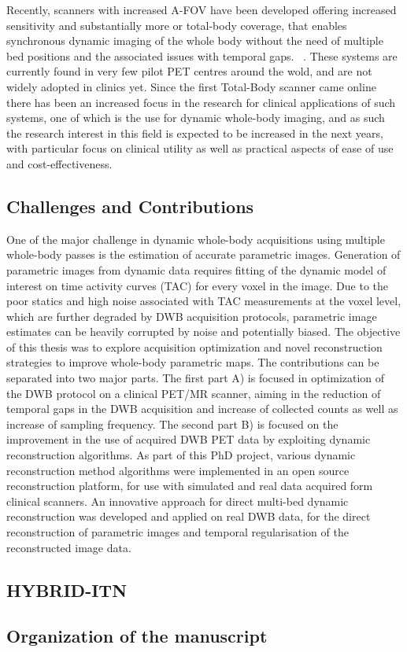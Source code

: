 Recently, scanners with increased A-FOV have been developed offering increased sensitivity and substantially more or total-body coverage, that enables synchronous dynamic imaging of the whole body without the need of multiple bed positions and the associated issues with temporal gaps. ~\cite{Karp2020,Siegel2020, Cherry2018}.
These systems are currently found in very few pilot PET centres around the wold, and are not widely adopted in clinics yet. Since the first Total-Body scanner came online there has been an increased focus in the research for clinical applications of such systems, one of which is the use for dynamic whole-body imaging, and as such the research interest in this field is expected to be increased in the next years, with particular focus on clinical utility as well as practical aspects of ease of use and cost-effectiveness.
\subsection*{Challenges and Contributions}
One of the major challenge in dynamic whole-body acquisitions using multiple whole-body passes is the estimation of accurate parametric images. Generation of parametric images from dynamic data requires fitting of the dynamic model of interest on time activity curves (TAC) for every voxel in the image. Due to the poor statics and high noise associated with TAC measurements at the voxel level, which are further degraded by DWB acquisition protocols, parametric image estimates can be heavily corrupted by noise and potentially biased. 
The objective of this thesis was to explore acquisition optimization and novel reconstruction strategies to improve whole-body parametric maps. 
The contributions can be separated into two major parts. The first part A) is focused in optimization of the DWB protocol on a clinical PET/MR scanner, aiming in the reduction of temporal gaps in the DWB acquisition and increase of collected counts as well as increase of sampling frequency. The second part B) is focused on the improvement in the use of acquired DWB PET data by exploiting dynamic reconstruction algorithms. As part of this PhD project, various dynamic reconstruction method algorithms were implemented in an open source reconstruction platform, for use with simulated and real data acquired form clinical scanners. An innovative approach for direct multi-bed dynamic reconstruction was developed and applied on real DWB data, for the direct reconstruction of parametric images and temporal regularisation of the reconstructed image data.

\subsection*{HYBRID-ITN}


\subsection*{Organization of the manuscript}
